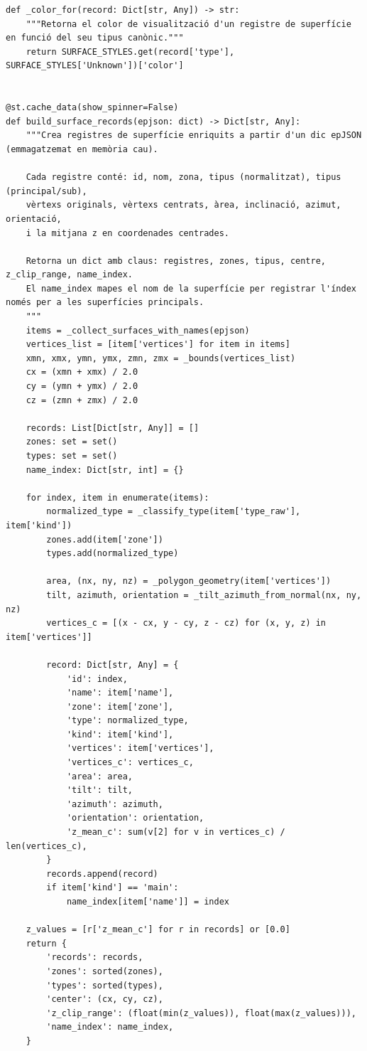 \documentclass[10pt,a4paper]{article}
\begin{document}
\begin{lstlisting}[style=studioPython,caption={backend/viewer\_3d\_backend.py},label={lst:backend-viewer-3d-backend-py}]
def _color_for(record: Dict[str, Any]) -> str:
    """Retorna el color de visualització d'un registre de superfície en funció del seu tipus canònic."""
    return SURFACE_STYLES.get(record['type'], SURFACE_STYLES['Unknown'])['color']


@st.cache_data(show_spinner=False)
def build_surface_records(epjson: dict) -> Dict[str, Any]:
    """Crea registres de superfície enriquits a partir d'un dic epJSON (emmagatzemat en memòria cau).

    Cada registre conté: id, nom, zona, tipus (normalitzat), tipus (principal/sub),
    vèrtexs originals, vèrtexs centrats, àrea, inclinació, azimut, orientació,
    i la mitjana z en coordenades centrades.

    Retorna un dict amb claus: registres, zones, tipus, centre, z_clip_range, name_index.
    El name_index mapes el nom de la superfície per registrar l'índex només per a les superfícies principals.
    """
    items = _collect_surfaces_with_names(epjson)
    vertices_list = [item['vertices'] for item in items]
    xmn, xmx, ymn, ymx, zmn, zmx = _bounds(vertices_list)
    cx = (xmn + xmx) / 2.0
    cy = (ymn + ymx) / 2.0
    cz = (zmn + zmx) / 2.0

    records: List[Dict[str, Any]] = []
    zones: set = set()
    types: set = set()
    name_index: Dict[str, int] = {}

    for index, item in enumerate(items):
        normalized_type = _classify_type(item['type_raw'], item['kind'])
        zones.add(item['zone'])
        types.add(normalized_type)

        area, (nx, ny, nz) = _polygon_geometry(item['vertices'])
        tilt, azimuth, orientation = _tilt_azimuth_from_normal(nx, ny, nz)
        vertices_c = [(x - cx, y - cy, z - cz) for (x, y, z) in item['vertices']]

        record: Dict[str, Any] = {
            'id': index,
            'name': item['name'],
            'zone': item['zone'],
            'type': normalized_type,
            'kind': item['kind'],
            'vertices': item['vertices'],
            'vertices_c': vertices_c,
            'area': area,
            'tilt': tilt,
            'azimuth': azimuth,
            'orientation': orientation,
            'z_mean_c': sum(v[2] for v in vertices_c) / len(vertices_c),
        }
        records.append(record)
        if item['kind'] == 'main':
            name_index[item['name']] = index

    z_values = [r['z_mean_c'] for r in records] or [0.0]
    return {
        'records': records,
        'zones': sorted(zones),
        'types': sorted(types),
        'center': (cx, cy, cz),
        'z_clip_range': (float(min(z_values)), float(max(z_values))),
        'name_index': name_index,
    }



\end{lstlisting}
\end{document}

